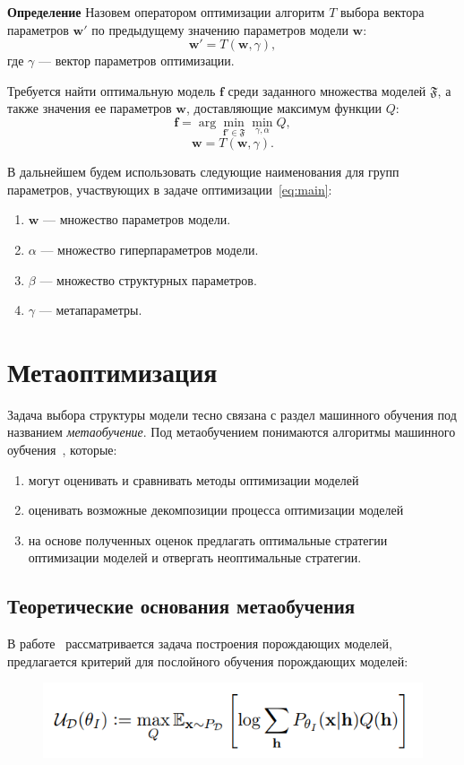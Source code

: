 \textbf{Определение } Назовем оператором оптимизации алгоритм $T$ выбора вектора параметров $\mathbf{w}'$ по предыдущему значению параметров модели $\mathbf{w}$:
    $$
        \mathbf{w}' = T(\mathbf{w}, \gamma),
    $$
где $\gamma$ --- вектор параметров оптимизации.
 

Требуется найти оптимальную модель $\mathbf{f}$ среди заданного множества моделей $\mathfrak{F}$, а также значения ее параметров $\mathbf{w}$, доставляющие максимум функции $Q$:
\begin{equation}
\label{eq:main}
\mathbf{f} = \arg \min_{\mathbf{f}' \in \mathfrak{F}} \min_{\gamma, \alpha} Q,
\end{equation}
\[
\mathbf{w} = T(\mathbf{w}, \gamma).
\]

В дальнейшем будем использовать следующие наименования для групп параметров, участвующих в задаче оптимизации~\eqref{eq:main}:
\begin{enumerate}
\item $\mathbf{w}$ --- множество параметров модели.
\item $\alpha$ --- множество гиперпараметров модели.
\item $\beta$ --- множество структурных параметров.
\item $\gamma$ --- метапараметры.
\end{enumerate}


\section{Метаоптимизация}
Задача выбора структуры модели тесно связана с раздел машинного обучения под названием \textit{метаобучение}. Под метаобучением понимаются алгоритмы машинного оубчения~\cite{metalearn}, которые:
\begin{enumerate}
\item могут оценивать и сравнивать методы оптимизации моделей
\item оценивать возможные декомпозиции процесса оптимизации моделей
\item на основе полученных оценок предлагать оптимальные стратегии оптимизации моделей и отвергать неоптимальные стратегии. 
\end{enumerate}



\subsection{Теоретические основания метаобучения }
В работе~\cite{layerwise_optimal} рассматривается задача построения порождающих моделей, предлагается критерий для послойного обучения порождающих моделей:
\begin{figure}[H]
\includegraphics[width=\textwidth]{./arch_review_figs/mub.png}
\end{figure}

